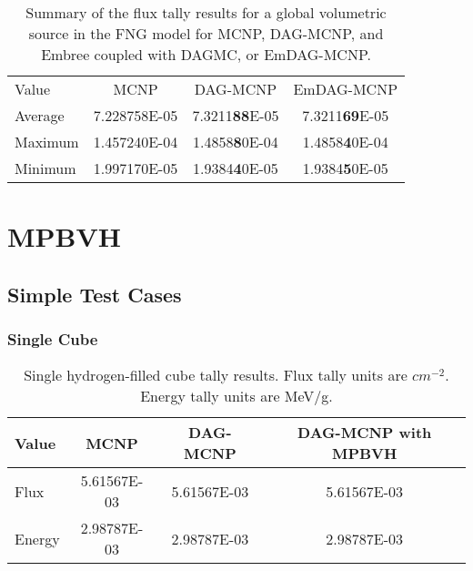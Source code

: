   \begin{table}[H]
    \small
    \begin{center}
      \begin{tabular}{lccc}
        \toprule
        Value & MCNP & DAG-MCNP & EmDAG-MCNP \\
        Average & 7.228758E-05 & 7.3211\textbf{88}E-05 & 7.3211\textbf{69}E-05 \\
        Maximum & 1.457240E-04 & 1.4858\textbf{8}0E-04 & 1.4858\textbf{4}0E-04 \\
        Minimum & 1.997170E-05 & 1.9384\textbf{4}0E-05 & 1.9384\textbf{5}0E-05 \\
      \end{tabular}
    \end{center}
    \caption[Flux tally results in FNG for various DAG-MCNP
      implementations.]{Summary of the flux tally results for a global
      volumetric source in the FNG model for MCNP, DAG-MCNP, and Embree coupled
      with DAGMC, or EmDAG-MCNP.}
  \end{table}

\section{MPBVH}

\subsection{Simple Test Cases}

  \subsubsection{Single Cube}

  \begin{table}[H]
    \small
    \begin{center}
      \begin{tabular}{lccc}
        \toprule
        Value & MCNP & DAG-MCNP & DAG-MCNP with MPBVH \\
        \toprule
        \hline
        Flux   & 5.61567E-03 & 5.61567E-03 & 5.61567E-03 \\
        Energy & 2.98787E-03 & 2.98787E-03 & 2.98787E-03 \\
        \bottomrule
      \end{tabular}
      \caption[Single hydrogen-filled cube tally results.]{Single
        hydrogen-filled cube tally results. Flux tally units are
        $cm^{-2}$. Energy tally units are MeV/g.}
      \label{nestedspheres}
    \end{center}
  \end{table}


